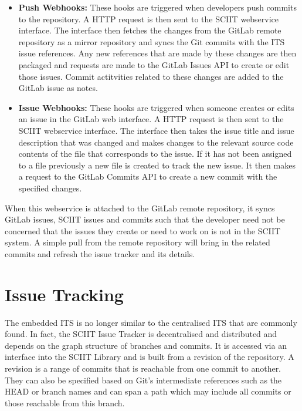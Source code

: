 \documentclass{mproj}
\begin{document}
\begin{itemize}
  \item \textbf{Push Webhooks:} These hooks are triggered when developers push commits to the repository. A HTTP request is then sent to the SCIIT webservice interface. The interface then fetches the changes from the GitLab remote repository as a mirror repository and syncs the Git commits with the ITS issue references. Any new references that are made by these changes are then packaged and requests are made to the GitLab Issues API to create or edit those issues. Commit actitvities related to these changes are added to the GitLab issue as notes.
  \item \textbf{Issue Webhooks:} These hooks are triggered when someone creates or edits an issue in the GitLab web interface. A HTTP request is then sent to the SCIIT webservice interface. The interface then takes the issue title and issue description that was changed and makes changes to the relevant source code contents of the file that corresponds to the issue. If it has not been assigned to a file previously a new file is created to track the new issue. It then makes a request to the GitLab Commits API to create a new commit with the specified changes.
\end{itemize}

When this webservice is attached to the GitLab remote repository, it syncs GitLab issues, SCIIT issues and commits such that the developer need not be concerned that the issues they create or need to work on is not in the SCIIT system. A simple pull from the remote repository will bring in the related commits and refresh the issue tracker and its details.




\section{Issue Tracking}

The embedded ITS is no longer similar to the centralised ITS that are commonly found. In fact, the SCIIT Issue Tracker is decentralised and distributed and depends on the graph structure of branches and commits. It is accessed via an interface into the SCIIT Library and is built from a revision of the repository. A revision is a range of commits that is reachable from one commit to another. They can also be specified based on Git's intermediate references such as the HEAD or branch names and can span a path which may include all commits or those reachable from this branch.
\end{document}
